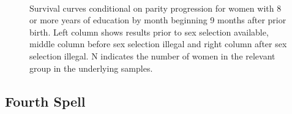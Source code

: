 \documentclass[12pt,letterpaper]{article}
\begin{document}
\begin{figure}[htpb]
{\begin{minipage}{0.31\textwidth}
        \captionsetup[subfigure]{labelformat=parens}
    \end{minipage}
} \\
\setcounter{subfigure}{5}
\setcounter{subfigure}{6}
\caption{Survival curves conditional on parity progression
for women with 8 or more years of education by month beginning 9 months after prior birth.
Left column shows results prior to sex selection available, middle column before
sex selection illegal and right column after sex selection illegal.
N indicates the number of women in the relevant group in the underlying samples.
}
\label{fig:results_spell3_high_pps}
\end{figure}




\clearpage
\newpage

\subsection{Fourth Spell}




\end{document}
